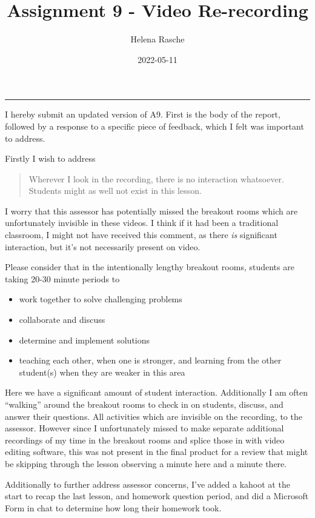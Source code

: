 \documentclass[paper=a4,justified,a4paper]{tufte-handout}
\title[A9 - Video Re-recording]{Assignment 9 - Video Re-recording}
\author{Helena Rasche}
\date{2022-05-11}
\providecommand{\tightlist}{%
  \setlength{\itemsep}{0pt}\setlength{\parskip}{0pt}}
\begin{document}
\maketitle
\noindent\rule{5in}{0.4pt}


I hereby submit an updated version of A9. First is the body of the
report, followed by a response to a specific piece of feedback, which I
felt was important to address.

Firstly I wish to address

\begin{quote}
Wherever I look in the recording, there is no interaction whatsoever.
Students might as well not exist in this lesson.
\end{quote}

I worry that this assessor has potentially missed the breakout rooms
which are unfortunately invisible in these videos. I think if it had
been a traditional classroom, I might not have received this comment, as
there \emph{is} significant interaction, but it's not necessarily
present on video.

Please consider that in the intentionally lengthy breakout rooms,
students are taking 20-30 minute periods to

\begin{itemize}
\tightlist
\item
  work together to solve challenging problems
\item
  collaborate and discuss
\item
  determine and implement solutions
\item
  teaching each other, when one is stronger, and learning from the other
  student(s) when they are weaker in this area
\end{itemize}

Here we have a significant amount of student interaction. Additionally I
am often ``walking'' around the breakout rooms to check in on students,
discuss, and answer their questions. All activities which are invisible
on the recording, to the assessor. However since I unfortunately missed
to make separate additional recordings of my time in the breakout rooms
and splice those in with video editing software, this was not present in
the final product for a review that might be skipping through the lesson
observing a minute here and a minute there.

Additionally to further address assessor concerns, I've added a kahoot
at the start to recap the last lesson, and homework question period, and
did a Microsoft Form in chat to determine how long their homework took.
\end{document}
